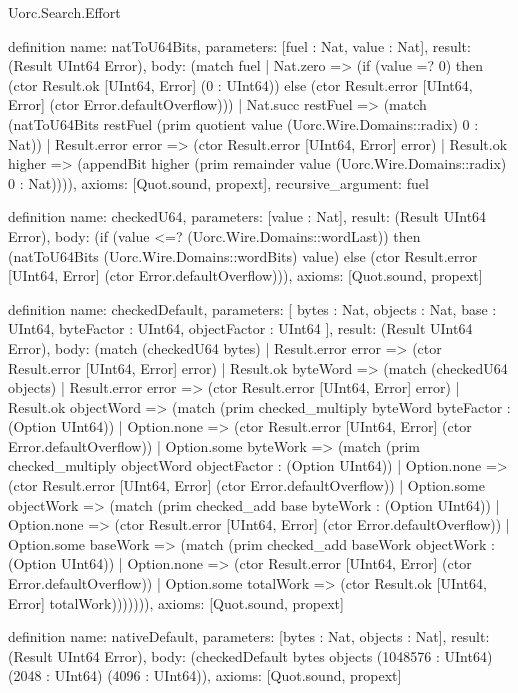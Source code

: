 \begin{lexlean}{Uorc.Search.Effort}
\begin{semanticmodule}
definition{
  name: natToU64Bits,
  parameters: [fuel : Nat, value : Nat],
  result: (Result UInt64 Error),
  body: (match fuel
    | Nat.zero => (if (value =? 0) then (ctor Result.ok [UInt64, Error] (0 : UInt64)) else (ctor Result.error [UInt64, Error] (ctor Error.defaultOverflow)))
    | Nat.succ restFuel => (match (natToU64Bits restFuel (prim quotient value (Uorc.Wire.Domains::radix) 0 : Nat))
      | Result.error error => (ctor Result.error [UInt64, Error] error)
      | Result.ok higher => (appendBit higher (prim remainder value (Uorc.Wire.Domains::radix) 0 : Nat)))),
  axioms: [Quot.sound, propext],
  recursive_argument: fuel
}

definition{
  name: checkedU64,
  parameters: [value : Nat],
  result: (Result UInt64 Error),
  body: (if (value <=? (Uorc.Wire.Domains::wordLast)) then (natToU64Bits (Uorc.Wire.Domains::wordBits) value) else (ctor Result.error [UInt64, Error] (ctor Error.defaultOverflow))),
  axioms: [Quot.sound, propext]
}

definition{
  name: checkedDefault,
  parameters: [
    bytes : Nat,
    objects : Nat,
    base : UInt64,
    byteFactor : UInt64,
    objectFactor : UInt64
  ],
  result: (Result UInt64 Error),
  body: (match (checkedU64 bytes)
    | Result.error error => (ctor Result.error [UInt64, Error] error)
    | Result.ok byteWord => (match (checkedU64 objects)
      | Result.error error => (ctor Result.error [UInt64, Error] error)
      | Result.ok objectWord => (match (prim checked_multiply byteWord byteFactor : (Option UInt64))
        | Option.none => (ctor Result.error [UInt64, Error] (ctor Error.defaultOverflow))
        | Option.some byteWork => (match (prim checked_multiply objectWord objectFactor : (Option UInt64))
          | Option.none => (ctor Result.error [UInt64, Error] (ctor Error.defaultOverflow))
          | Option.some objectWork => (match (prim checked_add base byteWork : (Option UInt64))
            | Option.none => (ctor Result.error [UInt64, Error] (ctor Error.defaultOverflow))
            | Option.some baseWork => (match (prim checked_add baseWork objectWork : (Option UInt64))
              | Option.none => (ctor Result.error [UInt64, Error] (ctor Error.defaultOverflow))
              | Option.some totalWork => (ctor Result.ok [UInt64, Error] totalWork))))))),
  axioms: [Quot.sound, propext]
}

definition{
  name: nativeDefault,
  parameters: [bytes : Nat, objects : Nat],
  result: (Result UInt64 Error),
  body: (checkedDefault bytes objects (1048576 : UInt64) (2048 : UInt64) (4096 : UInt64)),
  axioms: [Quot.sound, propext]
}


\end{semanticmodule}
\end{lexlean}
